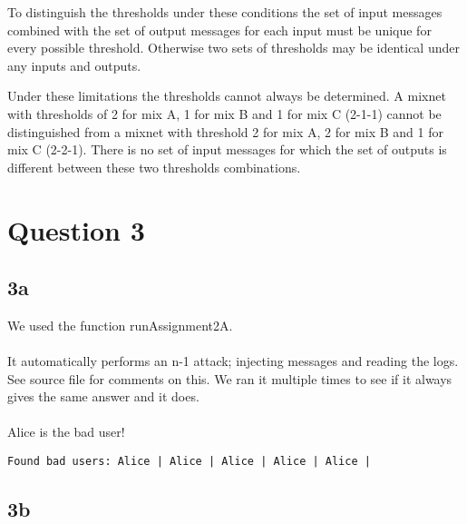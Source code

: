 \documentclass[a4paper,11pt]{article}
\begin{document}
To distinguish the thresholds under these conditions the set of input messages combined with the set of output messages for each input must be unique for every possible threshold. Otherwise two sets of thresholds may be identical under any inputs and outputs.

Under these limitations the thresholds cannot always be determined. A mixnet with thresholds of 2 for mix A, 1 for mix B and 1 for mix C (2-1-1) cannot be distinguished from a mixnet with threshold 2 for mix A, 2 for mix B and 1 for mix C (2-2-1). There is no set of input messages for which the set of outputs is different between these two thresholds combinations.

\section{Question 3}
\subsection{3a}
We used the function runAssignment2A. 
\paragraph{}It automatically performs an n-1 attack; injecting messages and reading the logs. See source file for comments on this.
We ran it multiple times to see if it always gives the same answer and it does. 
\paragraph{}Alice is the bad user!
\begin{lstlisting}
Found bad users: Alice | Alice | Alice | Alice | Alice | 
\end{lstlisting}


\subsection{3b}
\end{document}
